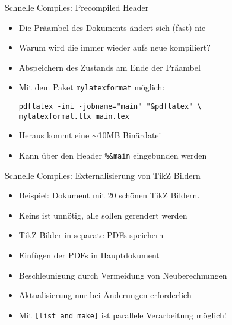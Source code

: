\documentclass[main.tex]{subfiles}
\begin{document}
\begin{frame}[fragile]{Schnelle Compiles: Precompiled Header}
    \begin{itemize}
        \item Die Präambel des Dokuments ändert sich (fast) nie
        \item Warum wird die immer wieder aufs neue kompiliert?
        \pause
        \medskip
        \item Abspeichern des Zustands am Ende der Präambel
        \pause
        \medskip
        \item Mit dem Paket \texttt{mylatexformat} möglich:
        \begin{verbatim}
pdflatex -ini -jobname="main" "&pdflatex" \
mylatexformat.ltx main.tex
        \end{verbatim}
        \pause
        \vspace{-15pt}
        \item Heraus kommt eine $\sim$10MB Binärdatei
        \item Kann über den Header \verb|%&main| eingebunden werden
    \end{itemize}
\end{frame}

\begin{frame}{Schnelle Compiles: Externalisierung von TikZ Bildern}
    \begin{itemize}
        \item Beispiel: Dokument mit 20 schönen TikZ Bildern.
        \item Keins ist unnötig, alle sollen gerendert werden
        \pause
        \medskip
        \pause
        \item TikZ-Bilder in separate PDFs speichern
        \pause
        \item Einfügen der PDFs in Hauptdokument
        \pause
        \item Beschleunigung durch Vermeidung von Neuberechnungen
        \pause
        \item Aktualisierung nur bei Änderungen erforderlich
        \pause
        \medskip
        \item Mit \texttt{[list and make]} ist parallele Verarbeitung möglich!
    \end{itemize}
\end{frame}
\end{document}
